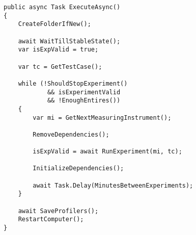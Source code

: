 
\begin{lstlisting}[caption=The method handeling dependencies and the validity of the results, label={lst:execute_async}]
public async Task ExecuteAsync()
{
    CreateFolderIfNew();

    await WaitTillStableState();
    var isExpValid = true;

    var tc = GetTestCase();

    while (!ShouldStopExperiment() 
            && isExperimentValid 
            && !EnoughEntires())
    {
        var mi = GetNextMeasuringInstrument();

        RemoveDependencies();

        isExpValid = await RunExperiment(mi, tc);

        InitializeDependencies();

        await Task.Delay(MinutesBetweenExperiments);
    }

    await SaveProfilers();
    RestartComputer();
}
\end{lstlisting}